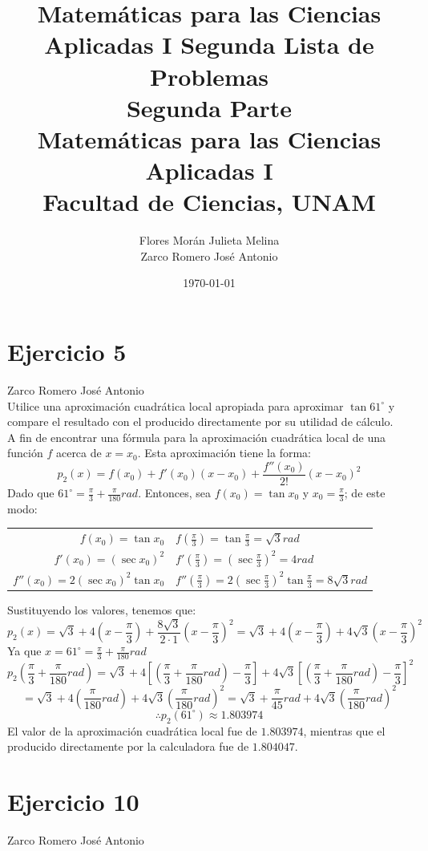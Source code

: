\documentclass[12pt]{article}
\title{Matemáticas para las Ciencias Aplicadas I}
\title{
	Segunda Lista de Problemas \\
	\textbf{Segunda Parte} \\
	\vspace{1ex}
	\large Matemáticas para las Ciencias Aplicadas I \\
	Facultad de Ciencias, UNAM}
\date{\today}
\author{Flores Morán Julieta Melina \\ Zarco Romero José Antonio}
\begin{document}
\maketitle


\section{Ejercicio 5} Zarco Romero José Antonio \\

Utilice una aproximación cuadrática local apropiada para aproximar $\tan 61^{\circ}$ y compare el resultado con el producido directamente por su utilidad de cálculo. \\

A fin de encontrar una fórmula para la aproximación cuadrática local de una función $f$ acerca de $x=x_0$. Esta aproximación tiene la forma:
\[p_2(x)=f(x_0)+f'(x_0)(x-x_0)+\frac{f''(x_0)}{2!}(x-x_0)^2\]
Dado que $61^{\circ} = \frac{\pi}{3} + \frac{\pi}{180} rad$. Entonces, sea $f(x_0)=\tan x_0$ y $x_0=\frac{\pi}{3}$; de este modo:
\begin{center}
\begin{tabular}{r l}
$f(x_0)=\tan x_0$ & $f(\frac{\pi}{3})=\tan \frac{\pi}{3}=\sqrt 3 rad$ \\
$f'(x_0)=(\sec x_0)^2$ & $f'(\frac{\pi}{3})=(\sec \frac{\pi}{3})^2=4 rad$ \\
$f''(x_0)=2 (\sec x_0)^2 \tan x_0$ & $f''(\frac{\pi}{3})=2 (\sec \frac{\pi}{3})^2 \tan \frac{\pi}{3}=8\sqrt 3 rad$ \\
\end{tabular}
\end{center}
Sustituyendo los valores, tenemos que:
\[
p_2(x)=\sqrt 3 + 4(x-\frac{\pi}{3}) + \frac{8 \sqrt 3}{2 \cdot 1}(x-\frac{\pi}{3})^2
=\sqrt 3 + 4(x-\frac{\pi}{3}) + 4 \sqrt 3(x-\frac{\pi}{3})^2
\]
Ya que $x=61^{\circ}=\frac{\pi}{3} + \frac{\pi}{180}rad$
\[
p_2(\frac{\pi}{3} + \frac{\pi}{180}rad)
=\sqrt 3 + 4[(\frac{\pi}{3} + \frac{\pi}{180}rad)-\frac{\pi}{3}] + 4 \sqrt 3[(\frac{\pi}{3} + \frac{\pi}{180}rad)-\frac{\pi}{3}]^2
\]
\[
=\sqrt 3 + 4(\frac{\pi}{180}rad) + 4 \sqrt 3(\frac{\pi}{180}rad)^2
= \sqrt 3 + \frac{\pi}{45}rad + 4 \sqrt 3(\frac{\pi}{180}rad)^2
\]
\[\therefore p_2(61^{\circ}) \approx 1.803974\]
El valor de la aproximación cuadrática local fue de $1.803974$, mientras que el producido directamente por la calculadora fue de $1.804047$.

\section{Ejercicio 10} Zarco Romero José Antonio \\
\end{document}
